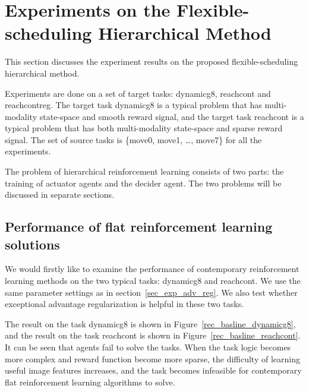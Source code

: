 
\section{Experiments on the Flexible-scheduling Hierarchical Method}
This section discusses the experiment results on the proposed flexible-scheduling hierarchical method.

Experiments are done on a set of target tasks: dynamicg8, reachcont and reachcontreg. The target task dynamicg8 is a typical problem that has multi-modality state-space and smooth reward signal, and the target task reachcont is a typical problem that has both multi-modality state-space and sparse reward signal. The set of source tasks is  \{move0, move1, \dots, move7\} for all the experiments.

The problem of hierarchical reinforcement learning consists of two parts: the training of actuator agents and the decider agent. The two problems will be discussed in separate sections.

\subsection{Performance of flat reinforcement learning solutions}
We would firstly like to examine the performance of contemporary reinforcement learning methods on the two typical tasks: dynamicg8 and reachcont. We use the same parameter settings as in section~\ref{sec_exp_adv_reg}. We also test whether exceptional advantage regularization is helpful in these two tasks.

The result on the task dynamicg8 is shown in Figure~\ref{rec_basline_dynamicg8}, and the result on the task reachcont is shown in Figure~\ref{rec_basline_reachcont}. It can be seen that agents fail to solve the tasks. When the task logic becomes more complex and reward function become more sparse, the difficulty of learning useful image features increases, and the task becomes infeasible for contemporary flat reinforcement learning algorithms to solve.

